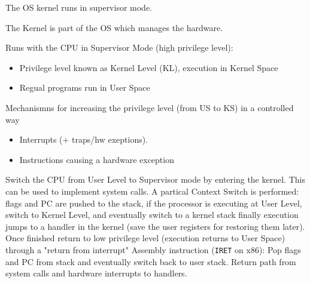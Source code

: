 The OS kernel runs in supervisor mode.


The Kernel is part of the OS which manages the hardware.

Runs with the CPU in Supervisor Mode (high privilege level):
\begin{itemize}
    \item Privilege level known as Kernel Level (KL), execution in Kernel Space
    \item Regual programs run in User Space
\end{itemize}
Mechanismns for increasing the privilege level (from US to KS) in a controlled way
\begin{itemize}
    \item Interrupts (+ traps/hw exeptions).
    \item Instructions causing a hardware exception
\end{itemize}
Switch the CPU from User Level to Supervisor mode by entering the kernel. This can be used to implement system calls.
A partical Context Switch is performed: flags and PC are pushed to the stack, if the processor is executing at User Level, switch to Kernel Level, and eventually switch to a kernel stack finally execution jumps to a handler in the kernel (save the user registers for restoring them later).
Once finished return to low privilege level (execution returns to User Space) through a "return from interrupt" Assembly instruction (\texttt{IRET} on x86): Pop flags and PC from stack and eventually switch back to user stack.
Return path  from system calls and hardware interrupts to handlers.

